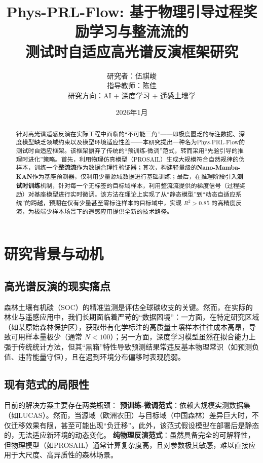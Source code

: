 \documentclass[12pt, a4paper]{article}
\title{\textbf{Phys-PRL-Flow: 基于物理引导过程奖励学习与整流流的\\测试时自适应高光谱反演框架研究}}
\author{研究者：伍祺峻 \\ 指导教师：陈佳 \\ 研究方向：AI + 深度学习 + 遥感土壤学}
\date{2026年1月}
\begin{document}
\maketitle

\begin{abstract}
针对高光谱遥感反演在实际工程中面临的“不可能三角”——即极度匮乏的标注数据、深度模型缺乏领域约束以及模型环境适应性差——本研究提出一种名为Phys-PRL-Flow的测试时自适应框架。该框架摒弃了传统的“预训练-微调”范式，转而采用“先验引导的推理时进化”策略。首先，利用物理仿真模型（PROSAIL）生成大规模符合自然规律的伪样本，训练一个\textbf{整流流}作为数据合理性验证器；其次，构建轻量级的\textbf{Nano-Mamba-KAN}作为基座预测器，仅利用少量源域数据进行基础训练；最后，在推理阶段引入\textbf{测试时训练}机制，针对每一个无标签的目标域样本，利用整流流提供的梯度信号（过程奖励）对基座模型进行实时微调。该方法在理论上实现了从“静态模型”到“动态自适应系统”的跨越，预期在仅有少量甚至零标注样本的目标域中，实现 $R^2 > 0.85$ 的高精度反演，为极端少样本场景下的遥感应用提供全新的技术路径。
\end{abstract}

\newpage
\tableofcontents
\newpage

\section{研究背景与动机}

\subsection{高光谱反演的现实痛点}
森林土壤有机碳（SOC）的精准监测是评估全球碳收支的关键。然而，在实际的林业与遥感应用中，我们长期面临着严苛的“数据困境”：一方面，在特定研究区域（如某原始森林保护区），获取带有化学标注的高质量土壤样本往往成本高昂，导致可用样本量极少（通常 $N < 100$）；另一方面，深度学习模型虽然在拟合能力上强于传统统计方法，但其“黑箱”特性导致预测结果常违反基本物理常识（如预测负值、违背能量守恒），且在遇到环境分布偏移时表现脆弱。

\subsection{现有范式的局限性}
目前的解决方案主要存在两类瓶颈：
\textbf{预训练-微调范式}：依赖大规模实测数据集（如LUCAS）。然而，当源域（欧洲农田）与目标域（中国森林）差异巨大时，不仅迁移效果有限，甚至可能出现“负迁移”。此外，该范式假设模型在部署后是静态的，无法适应新环境的动态变化。
\textbf{纯物理反演范式}：虽然具备完全的可解释性，但物理模型（如PROSAIL）通常计算复杂度高，且对参数极其敏感，难以直接应用于大尺度、高异质性的森林场景。
\end{document}
